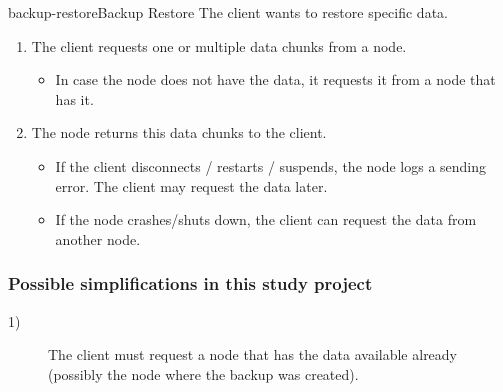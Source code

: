 \begin{scenario}{backup-restore}{Backup Restore}
	The client wants to restore specific data.
	
	\begin{enumerate}
		\item The client requests one or multiple data chunks from a node.
			\begin{itemize}
				\item In case the node does not have the data, it requests it from a node that has it. %
			\end{itemize}
		\item The node returns this data chunks to the client.
			\begin{itemize}
				\item If the client disconnects / restarts / suspends, the node logs a sending error. The client may request the data later.
				\item If the node crashes/shuts down, the client can request the data from another node.
			\end{itemize}
	\end{enumerate}
    
	\subsubsection{Possible simplifications in this study project}
	\begin{description}
	 	\item[1)] The client must request a node that has the data available already (possibly the node where the backup was created).
	\end{description}
\end{scenario}


